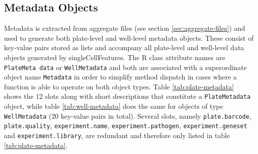 \subsection{Metadata Objects}

\label{sec:metadata-objects}
Metadata is extracted from aggregate files (see section \ref{sec:aggregate-files}) and used to generate both plate-level and well-level metadata objects. These consist of key-value pairs stored as lists and accompany all plate-level and well-level data objects generated by singleCellFeatures. The R class attribute names are \texttt{PlateMeta data} or \texttt{WellMetadata} and both are associated with a superordinate object name \texttt{Metadata} in order to simplify method dispatch in cases where a function is able to operate on both object types. Table \ref{tab:plate-metadata} shows the 12 slots along with short descriptions that constitute a \texttt{PlateMetadata} object, while table \ref{tab:well-metadata} does the same for objects of type \texttt{WellMetadata} (20 key-value pairs in total). Several slots, namely \texttt{plate.barcode}, \texttt{plate.quality}, \texttt{experiment.name}, \texttt{experiment.pathogen}, \texttt{experiment.geneset} and \texttt{experiment.library}, are redundant and therefore only listed in table \ref{tab:plate-metadata}.

